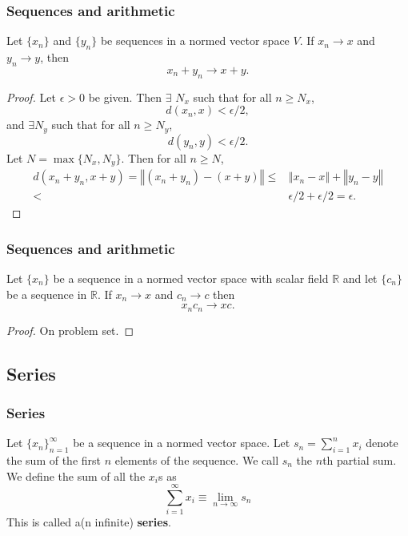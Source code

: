 \documentclass[compress]{beamer}
\def\R{\mathbb{R}}
\newcommand{\norm}[1]{\left\Vert {#1} \right\Vert}
\newcommand{\seq}[1]{\{{#1}_n \}_{n=1}^\infty }
\renewcommand{\to}{{\rightarrow}}
\begin{document}
\begin{frame}
  \frametitle{Sequences and arithmetic}
  \begin{theorem}
    Let $\{x_n\}$ and $\{y_n\}$ be sequences in a normed vector space
    $V$. If $x_n \to x$ and $y_n \to y$, then
    \[ x_n + y_n \to x + y. \]
  \end{theorem}
  \begin{proof}
    Let $\epsilon > 0$ be given. Then $\exists$ $N_x$ such that for all
    $n \geq N_x$, 
    \[ d(x_n,x) < \epsilon/2,\] and $\exists N_y$ such that
    for all $n \geq N_y$,  
    \[ d(y_n,y) < \epsilon/2. \]
    Let $N =\max\{N_x,N_y\}$. Then for all $n \geq N$, 
    \begin{align*}
      d(x_n + y_n,x+y) = \norm{(x_n + y_n) - (x+y)} \leq & \norm{x_n -
        x} + \norm{y_n - y} \\
      < & \epsilon/2 + \epsilon /2  = \epsilon.
    \end{align*}  
  \end{proof}
\end{frame}

\begin{frame}
  \frametitle{Sequences and arithmetic}
  \begin{theorem}
    Let $\{x_n \}$ be a sequence in a normed vector space with scalar
    field $\R$ and let $\{c_n\}$ be a sequence in $\R$. If
    $x_n \to x$ and $c_n \to c$ then 
    \[ x_n c_n \to x c. \]
  \end{theorem}
  \begin{proof}
    On problem set. 
  \end{proof}
\end{frame}

\subsection*{Series}
\begin{frame}\frametitle{Series}
  \begin{definition}
    Let $\seq{x}$ be a sequence in a normed vector space. Let $s_n =
    \sum_{i=1}^n x_i$ denote the sum of the first $n$ elements of the
    sequence. We call $s_n$ the $n$th partial sum. We define the sum of
    all the $x_i$s as
    \[ \sum_{i=1}^\infty x_i \equiv \lim_{n \to \infty} s_n \]
    This is called a(n infinite) \textbf{series}. 
  \end{definition}
\end{frame}
\end{document}
